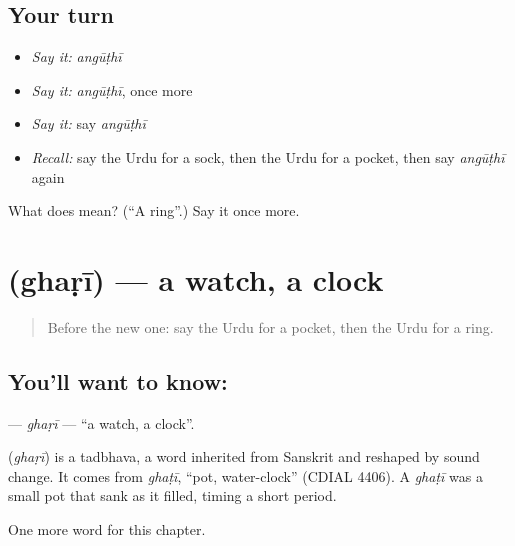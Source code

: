 \subsection*{Your turn}
\begin{itemize}
\raggedright
  \item \emph{Say it:} \emph{angūṭhī}
  \item \emph{Say it:} \emph{angūṭhī}, once more
  \item \emph{Say it:} say \emph{angūṭhī}
  \item \emph{Recall:} say the Urdu for a sock, then the Urdu for a pocket, then say \emph{angūṭhī} again
\end{itemize}

\begin{tcolorbox}[breakable,colback=teal!4,colframe=teal!35!black,title={Before you move on}]
What does  mean? (\textquotedblleft{}A ring\textquotedblright{}.) Say it once more.
\end{tcolorbox}
\section[\texorpdfstring{\ur{گھڑی} (ghaṛī)}{گھڑی (ghaṛī)}]{ (ghaṛī) — a watch, a clock}

\label{lesson:UR-C83-ghari}



\begin{quote}
Before the new one: say the Urdu for a pocket, then the Urdu for a ring.
\end{quote}

\subsection*{You'll want to know: }
\textbf{} — \emph{ghaṛī} — \textquotedblleft{}a watch, a clock\textquotedblright{}.

\begin{cousinweb}
\textbf{} (\emph{ghaṛī}) is a tadbhava, a word inherited from Sanskrit and reshaped by sound change. It comes from \emph{ghaṭī}, \textquotedblleft{}pot, water-clock\textquotedblright{} (CDIAL 4406). A \emph{ghaṭī} was a small pot that sank as it filled, timing a short period.
\end{cousinweb}

\begin{grammarlens}[title={What you've built}]
One more word for this chapter.
\end{grammarlens}

